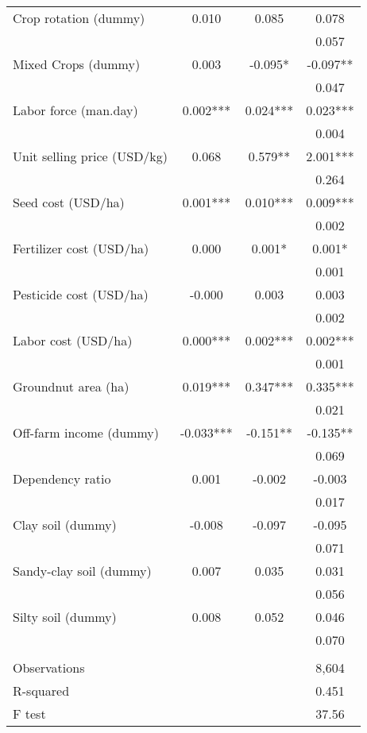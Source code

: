 \documentclass[]{article}
\begin{document}
\begin{tabular}{lccc}
Crop rotation (dummy) & 0.010 & 0.085 & 0.078 \\
 &  &  & 0.057 \\
Mixed Crops (dummy) & 0.003 & -0.095* & -0.097** \\
 &  &  & 0.047 \\
Labor force (man.day) & 0.002*** & 0.024*** & 0.023*** \\
 &  &  & 0.004 \\
Unit selling price (USD/kg) & 0.068 & 0.579** & 2.001*** \\
 &  &  & 0.264 \\
Seed cost (USD/ha) & 0.001*** & 0.010*** & 0.009*** \\
 &  &  & 0.002 \\
Fertilizer cost (USD/ha) & 0.000 & 0.001* & 0.001* \\
 &  &  & 0.001 \\
Pesticide cost (USD/ha) & -0.000 & 0.003 & 0.003 \\
 &  &  & 0.002 \\
Labor cost (USD/ha) & 0.000*** & 0.002*** & 0.002*** \\
 &  &  & 0.001 \\
Groundnut area (ha) & 0.019*** & 0.347*** & 0.335*** \\
 &  &  & 0.021 \\
Off-farm income (dummy) & -0.033*** & -0.151** & -0.135** \\
 &  &  & 0.069 \\
Dependency ratio & 0.001 & -0.002 & -0.003 \\
 &  &  & 0.017 \\
Clay soil (dummy) & -0.008 & -0.097 & -0.095 \\
 &  &  & 0.071 \\
Sandy-clay soil (dummy) & 0.007 & 0.035 & 0.031 \\
 &  &  & 0.056 \\
Silty soil (dummy) & 0.008 & 0.052 & 0.046 \\
 &  &  & 0.070 \\
 &  &  &  \\
Observations &  &  & 8,604 \\
R-squared &  &  & 0.451 \\
 F test &  &  & 37.56 \\ \hline
\end{tabular}
\end{document}

